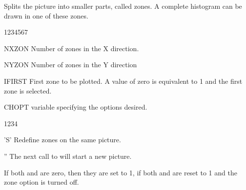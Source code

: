 \Action
Splits the picture into smaller parts, called zones. A complete histogram can be
drawn in one of these zones.
\Pdesc
\begin{DLtt}{1234567}
\item[NXZON]  Number of zones in the X direction.
\item[NYZON]  Number of zones in the Y direction
\item[IFIRST] First zone to be plotted. A value of zero is equivalent to 1 and
              the first zone is selected.
\item[CHOPT] \CHARACTER{} variable specifying the options desired.
\begin{DLtt}{1234}
\item['S'] Redefine zones on the same picture.
\item['']  The next call to  will start a new picture.
\end{DLtt}
\end{DLtt}
If both  and  are zero, then they are set to 1, if both 
 and  are reset to 1 and the zone option is turned off.
\Remarks
